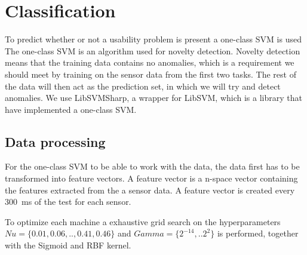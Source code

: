 \section{Classification}
To predict whether or not a usability problem is present a one-class SVM is used
The one-class SVM is an algorithm used for novelty detection. Novelty detection means that the training data contains no anomalies, which is a requirement we should meet by training on the sensor data from the first two tasks.
The rest of the data will then act as the prediction set, in which we will try and detect anomalies.
We use LibSVMSharp\cite{libsvmsharp}, a wrapper for LibSVM\cite{libsvm}, which is a library that have implemented a one-class SVM.

\subsection{Data processing}
For the one-class SVM to be able to work with the data, the data first has to be transformed into feature vectors.
A feature vector is a n-space vector containing the features extracted from the a sensor data.
A feature vector is created every 300~ms of the test for each sensor.


To optimize each machine a exhaustive grid search on the hyperparameters $Nu = \{0.01,0.06,..,0.41, 0.46\}$ and $Gamma = \{2^{-14},..2^2\}$ is performed, together with the Sigmoid and RBF kernel. 

